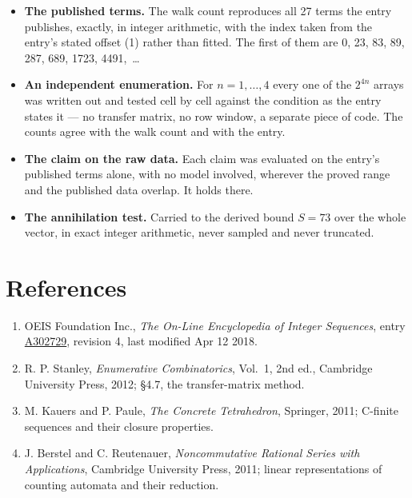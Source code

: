 \documentclass[11pt]{article}
\theoremstyle{definition}
\begin{document}
\begin{itemize}

\item {\bfseries The published terms.} The walk count reproduces all 27 terms the entry publishes, exactly, in integer arithmetic, with the index taken from the entry's stated offset (1) rather than fitted. The first of them are 0, 23, 83, 89, 287, 689, 1723, 4491,~\dots

\item {\bfseries An independent enumeration.} For $n = 1,\dots,4$ every one of the $2^{4n}$ arrays was written out and tested cell by cell against the condition as the entry states it --- no transfer matrix, no row window, a separate piece of code. The counts agree with the walk count and with the entry.

\item {\bfseries The claim on the raw data.} Each claim was evaluated on the entry's published terms alone, with no model involved, wherever the proved range and the published data overlap. It holds there.

\item {\bfseries The annihilation test.} Carried to the derived bound $S = 73$ over the whole vector, in exact integer arithmetic, never sampled and never truncated.

\end{itemize}

\section{References}

\begin{enumerate}

\item OEIS Foundation Inc., \emph{The On-Line Encyclopedia of Integer Sequences}, entry \href{https://oeis.org/A302729}{A302729}, revision 4, last modified Apr 12 2018.

\item R. P. Stanley, \emph{Enumerative Combinatorics}, Vol.~1, 2nd ed., Cambridge University Press, 2012; \S4.7, the transfer-matrix method.

\item M. Kauers and P. Paule, \emph{The Concrete Tetrahedron}, Springer, 2011; C-finite sequences and their closure properties.

\item J. Berstel and C. Reutenauer, \emph{Noncommutative Rational Series with Applications}, Cambridge University Press, 2011; linear representations of counting automata and their reduction.

\end{enumerate}
\end{document}
